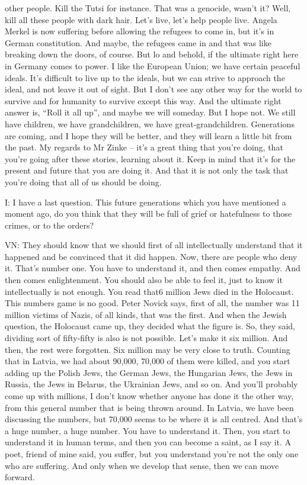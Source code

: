 other people. Kill the Tutsi for instance. That was a genocide, wasn’t it? Well, kill all these people with dark hair. Let’s live, let’s help people live. Angela Merkel is now suffering before allowing the refugees to come in, but it’s in German constitution. And maybe, the refugees came in and that was like breaking down the doors, of course. But lo and behold, if the ultimate right here in Germany comes to power. I like the European Union; we have certain peaceful ideals. It’s difficult to live up to the ideals, but we can strive to approach the ideal, and not leave it out of sight. But I don’t see any other way for the world to survive and for humanity to survive except this way. And the ultimate right answer is, “Roll it all up”, and maybe we will someday. But I hope not. We still have children, we have grandchildren, we have great-grandchildren. Generations are coming, and I hope they will be better, and they will learn a little bit from the past. My regards to Mr Zinke – it’s a great thing that you’re doing, that you’re going after these stories, learning about it. Keep in mind that it’s for the present and future that you are doing it. And that it is not only the task that you’re doing that all of us should be doing.

I: I have a last question. This future generations which you have mentioned a moment ago, do you think that they will be full of grief or hatefulness to those crimes, or to the orders?

VN: They should know that we should first of all intellectually understand that it happened and be convinced that it did happen. Now, there are people who deny it. That’s number one. You have to understand it, and then comes empathy. And then comes enlightenment. You should also be able to feel it, just to know it intellectually is not enough. You read that6 million Jews died in the Holocaust. This numbers game is no good. Peter Novick says, first of all, the number was 11 million victims of Nazis, of all kinds, that was the first. And when the Jewish question, the Holocaust came up, they decided what the figure is. So, they said, dividing sort of fifty-fifty is also is not possible. Let’s make it six million. And then, the rest were forgotten. Six million may be very close to truth. Counting that in Latvia, we had about 90,000, 70,000 of them were killed, and you start adding up the Polish Jews, the German Jews, the Hungarian Jews, the Jews in Russia, the Jews in Belarus, the Ukrainian Jews, and so on. And you’ll probably come up with millions, I don’t know whether anyone has done it the other way, from this general number that is being thrown around. In Latvia, we have been discussing the numbers, but 70,000 seems to be where it is all centred. And that’s a huge number, a huge number. You have to understand it. Then, you start to understand it in human terms, and then you can become a saint, as I say it. A poet, friend of mine said, you suffer, but you understand you’re not the only one who are suffering. And only when we develop that sense, then we can move forward. 

